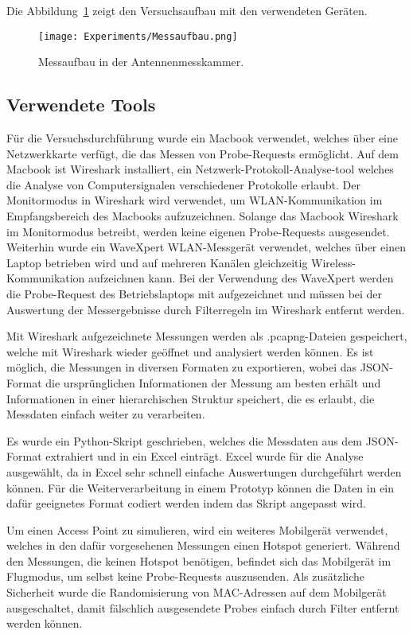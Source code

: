 Die Abbildung~\ref{figure:experimentalsetup} zeigt den Versuchsaufbau mit 
den verwendeten Geräten.

\begin{figure}[h!]
	\centering
	\texttt{[image: Experiments/Messaufbau.png]}
    \caption{Messaufbau in der Antennenmesskammer.
	\label{figure:experimentalsetup}}
\end{figure}

\clearpage

\subsection{Verwendete Tools}
Für die Versuchsdurchführung wurde ein Macbook verwendet, welches über eine 
Netzwerkkarte verfügt, die das Messen von Probe-Requests ermöglicht.
Auf dem Macbook ist Wireshark installiert, ein Netzwerk-Protokoll-Analyse-tool
welches die Analyse von Computersignalen verschiedener Protokolle erlaubt.
Der Monitormodus in Wireshark wird verwendet, um WLAN-Kommunikation im 
Empfangsbereich des Macbooks aufzuzeichnen.
Solange das Macbook Wireshark im Monitormodus betreibt, werden keine eigenen
Probe-Requests ausgesendet.
Weiterhin wurde ein WaveXpert WLAN-Messgerät verwendet, 
welches über einen Laptop betrieben wird und auf mehreren Kanälen gleichzeitig
Wireless-Kommunikation aufzeichnen kann.
Bei der Verwendung des WaveXpert werden die Probe-Request des Betriebslaptops
mit aufgezeichnet und müssen bei der Auswertung der Messergebnisse durch 
Filterregeln im Wireshark entfernt werden. 

Mit Wireshark aufgezeichnete Messungen werden als .pcapng-Dateien gespeichert,
welche mit Wireshark wieder geöffnet und analysiert werden können.
Es ist möglich, die Messungen in diversen Formaten zu exportieren, 
wobei das JSON-Format die ursprünglichen Informationen der Messung am 
besten erhält und Informationen in einer hierarchischen Struktur speichert,
die es erlaubt, die Messdaten einfach weiter zu verarbeiten.

Es wurde ein Python-Skript geschrieben, welches die Messdaten aus dem 
JSON-Format extrahiert und in ein Excel einträgt. 
Excel wurde für die Analyse ausgewählt, da in Excel sehr schnell einfache
Auswertungen durchgeführt werden können. 
Für die Weiterverarbeitung in einem Prototyp können die Daten in ein dafür
geeignetes Format codiert werden indem das Skript angepasst wird.

Um einen Access Point zu simulieren, wird ein weiteres Mobilgerät verwendet, 
welches in den dafür vorgesehenen Messungen einen Hotspot generiert.
Während den Messungen, die keinen Hotspot benötigen, befindet sich das
Mobilgerät im Flugmodus, um selbst keine Probe-Requests auszusenden.
Als zusätzliche Sicherheit wurde die Randomisierung von MAC-Adressen auf 
dem Mobilgerät ausgeschaltet, damit fälschlich ausgesendete Probes einfach
durch Filter entfernt werden können.

